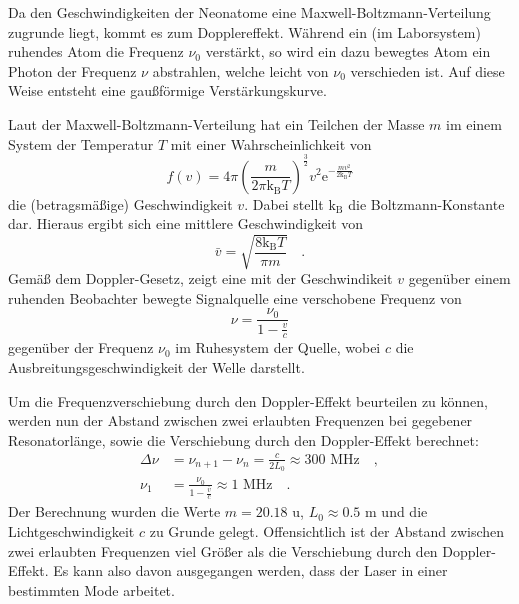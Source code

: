 Da den Geschwindigkeiten der Neonatome eine Maxwell-Boltzmann-Verteilung
zugrunde liegt, kommt es zum Dopplereffekt. Während ein (im Laborsystem)
ruhendes Atom die Frequenz $\nu_0$ verstärkt, so wird ein dazu bewegtes
Atom ein Photon der Frequenz $\nu$ abstrahlen, welche leicht von $\nu_0$
verschieden ist. Auf diese Weise entsteht eine gaußförmige Verstärkungskurve.

Laut der Maxwell-Boltzmann-Verteilung hat ein Teilchen der Masse $m$ im einem 
System der Temperatur $T$ mit einer Wahrscheinlichkeit von
\begin{equation}
f(v)=4\pi \left( \frac{m}{2\pi \text{k}_\text{B} T} \right)^\frac{3}{2} v^2 
\text{e}^{-\frac{mv^2}{2\text{k}_\text{B}T}}
\end{equation}
die (betragsmäßige) Geschwindigkeit $v$. Dabei stellt $\text{k}_\text{B}$ die 
Boltzmann-Konstante dar. Hieraus ergibt sich eine mittlere Geschwindigkeit von 
\begin{equation}
\bar{v}=\sqrt{\frac{8\text{k}_\text{B}T}{\pi m}} \quad .
\end{equation}
Gemäß dem Doppler-Gesetz, zeigt eine mit der Geschwindikeit $v$ gegenüber einem 
ruhenden Beobachter bewegte Signalquelle eine verschobene Frequenz von 
\begin{equation}
\nu = \frac{\nu_0}{1-\frac{v}{c}}
\end{equation}
gegenüber der Frequenz $\nu_0$ im Ruhesystem der Quelle, wobei $c$ die 
Ausbreitungsgeschwindigkeit der Welle darstellt.


Um die Frequenzverschiebung durch den Doppler-Effekt beurteilen zu können, werden 
nun der Abstand zwischen zwei erlaubten Frequenzen bei gegebener Resonatorlänge,
sowie die Verschiebung durch den Doppler-Effekt berechnet:
\begin{align}
\Delta \nu &= \nu_{n+1}-\nu_n=\frac{c}{2 L_0} \approx 300\text{ MHz} \quad , \\
\nu _1 &=  \frac{\nu_0}{1-\frac{\bar{v}}{c}} \approx 1 \text{ MHz} \quad .
\end{align}
Der Berechnung wurden die Werte $m=20.18 \text{ u}$, $L_0\approx 0.5 \text{ m}$ und  
die Lichtgeschwindigkeit $c$ zu Grunde gelegt. Offensichtlich ist der Abstand 
zwischen zwei erlaubten Frequenzen viel Größer als die Verschiebung durch den 
Doppler-Effekt. Es kann also davon ausgegangen werden, dass der Laser in einer 
bestimmten Mode arbeitet.